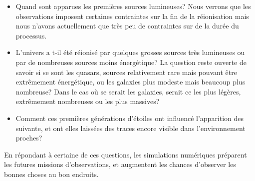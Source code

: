 \begin{itemize}
\item Quand sont apparues les premières sources lumineuses?
Nous verrons que les observations imposent certaines contraintes sur la fin de la réionisation mais nous n'avons actuellement que  très peu de contraintes sur de la durée du processus.

\item L'univers a t-il été réionisé par quelques grosses sources très lumineuses ou par de nombreuses sources moins énergétique?
La question reste ouverte de savoir si se sont les quasars, sources relativement rare mais pouvant être extrêmement énergétique, ou les galaxies plus modeste mais beaucoup plus nombreuse?
Dans le cas où se serait les galaxies, serait ce les plus légères, extrêmement nombreuses ou les plus massives?

\item Comment ces premières générations d'étoiles ont influencé l'apparition des suivante, et ont elles laissées des traces encore visible dans l'environnement proches?

\end{itemize} 

En répondant à certaine de ces questions, les simulations numériques préparent les futures missions d'observations, et augmentent les chances d'observer les bonnes choses au bon endroits.



